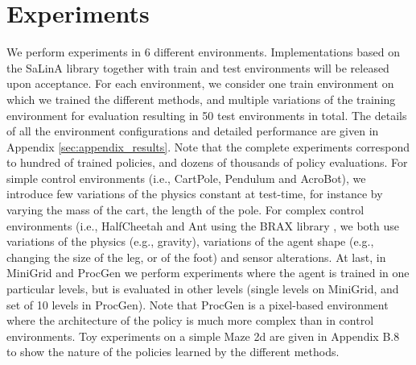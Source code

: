 \vspace{-0.2cm}
\section{Experiments}
\label{sec:Experiments}
\vspace{-0.2cm}

We perform experiments in 6 different environments.
Implementations based on the SaLinA \citep{salina} library together with train and test environments will be released upon acceptance. For each environment, we consider one train environment on which we trained the different methods, and multiple variations of the training environment for evaluation resulting in 50 test environments in total. The details of all the environment configurations and detailed performance are given in Appendix \ref{sec:appendix_results}. Note that the complete experiments correspond to hundred of trained policies, and dozens of thousands of policy evaluations. For simple control environments (i.e., CartPole, Pendulum and AcroBot), we introduce few variations of the physics constant at test-time, for instance by varying the mass of the cart, the length of the pole. For complex control environments (i.e., HalfCheetah and Ant using the BRAX library \citep{brax2021github}, we both use variations of the physics (e.g., gravity), variations of the agent shape (e.g., changing the size of the leg, or of the foot) and sensor alterations. At last, in MiniGrid and ProcGen we perform experiments where the agent is trained in one particular levels, but is evaluated in other levels (single levels on MiniGrid, and set of 10 levels in ProcGen). Note that ProcGen is a pixel-based environment where the architecture of the policy is much more complex than in control environments.  Toy experiments on a simple Maze 2d are given in Appendix B.8 to show the nature of the policies learned by the different methods.

